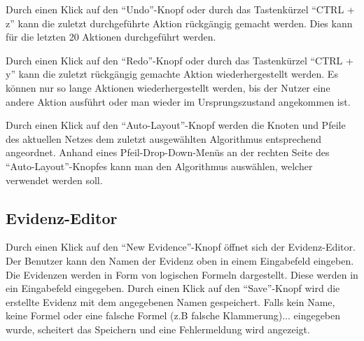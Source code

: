 \documentclass[parskip=full,11pt,twoside]{scrartcl}
\begin{document}
Durch einen Klick auf den \enquote{Undo}-Knopf oder durch das Tastenkürzel \enquote{CTRL + z} kann die zuletzt durchgeführte Aktion rückgängig gemacht werden. Dies kann für die letzten 20 Aktionen durchgeführt werden.

Durch einen Klick auf den \enquote{Redo}-Knopf oder durch das Tastenkürzel \enquote{CTRL + y} kann die zuletzt rückgängig gemachte Aktion wiederhergestellt werden. Es können nur so lange Aktionen wiederhergestellt werden, bis der Nutzer eine andere Aktion ausführt oder man wieder im Ursprungszustand angekommen ist.


Durch einen Klick auf den \enquote{Auto-Layout}-Knopf werden die Knoten und Pfeile des aktuellen Netzes dem zuletzt ausgewählten Algorithmus entsprechend angeordnet. Anhand eines Pfeil-Drop-Down-Menüs an der rechten Seite des \enquote{Auto-Layout}-Knopfes kann man den Algorithmus auswählen, welcher verwendet werden soll.

\subsection{Evidenz-Editor}


Durch einen Klick auf den \enquote{New Evidence}-Knopf öffnet sich der Evidenz-Editor. 
Der Benutzer kann den Namen der Evidenz oben in einem Eingabefeld eingeben.
Die Evidenzen werden in Form von logischen Formeln dargestellt. Diese werden in ein Eingabefeld eingegeben.
Durch einen Klick auf den \enquote{Save}-Knopf wird die erstellte Evidenz mit dem angegebenen Namen gespeichert.
Falls kein Name, keine Formel oder eine falsche Formel (z.B falsche Klammerung)... eingegeben wurde, scheitert das Speichern und eine Fehlermeldung wird angezeigt.
\end{document}
